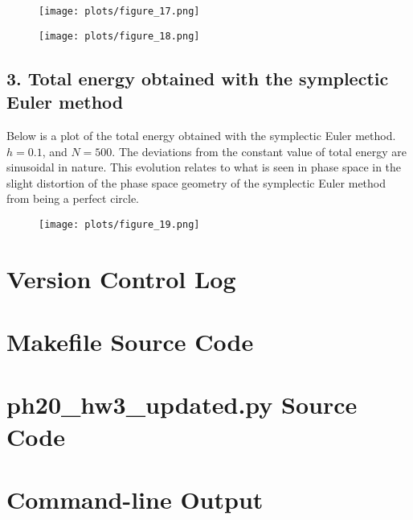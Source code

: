 \documentclass{article}
\begin{document}
\begin{figure}[H]
\centering
\texttt{[image: plots/figure\_17.png]}
\end{figure}

\begin{figure}[H]
\centering
\texttt{[image: plots/figure\_18.png]}
\end{figure}

\subsection*{3. Total energy obtained with the symplectic Euler method}
Below is a plot of the total energy obtained with the symplectic Euler method. $h = 0.1$, and $N = 500$. The deviations from the constant value of total energy are sinusoidal in nature. This evolution relates to what is seen in phase space in the slight distortion of the phase space geometry of the symplectic Euler method from being a perfect circle.

\begin{figure}[H]
\centering
\texttt{[image: plots/figure\_19.png]}
\end{figure}

\section*{Version Control Log}


\section*{Makefile Source Code}


\section*{ph20\_hw3\_updated.py Source Code}


\section*{Command-line Output}

\end{document}
